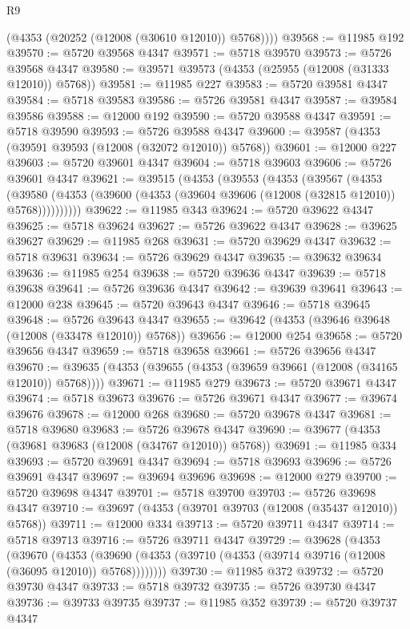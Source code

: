 \begin{lexlean}{R9}
\begin{coremodule}
        (@4353 (@20252 (@12008 (@30610 @12010)) @5768))))
@39568 := @11985 @192
@39570 := @5720 @39568 @4347
@39571 := @5718 @39570
@39573 := @5726 @39568 @4347
@39580 := @39571 @39573 (@4353 (@25955 (@12008 (@31333 @12010)) @5768))
@39581 := @11985 @227
@39583 := @5720 @39581 @4347
@39584 := @5718 @39583
@39586 := @5726 @39581 @4347
@39587 := @39584 @39586
@39588 := @12000 @192
@39590 := @5720 @39588 @4347
@39591 := @5718 @39590
@39593 := @5726 @39588 @4347
@39600 := @39587 (@4353 (@39591 @39593 (@12008 (@32072 @12010)) @5768))
@39601 := @12000 @227
@39603 := @5720 @39601 @4347
@39604 := @5718 @39603
@39606 := @5726 @39601 @4347
@39621 := @39515
    (@4353
      (@39553
        (@4353
          (@39567
            (@4353
              (@39580 (@4353 (@39600 (@4353 (@39604 @39606 (@12008 (@32815 @12010)) @5768))))))))))
@39622 := @11985 @343
@39624 := @5720 @39622 @4347
@39625 := @5718 @39624
@39627 := @5726 @39622 @4347
@39628 := @39625 @39627
@39629 := @11985 @268
@39631 := @5720 @39629 @4347
@39632 := @5718 @39631
@39634 := @5726 @39629 @4347
@39635 := @39632 @39634
@39636 := @11985 @254
@39638 := @5720 @39636 @4347
@39639 := @5718 @39638
@39641 := @5726 @39636 @4347
@39642 := @39639 @39641
@39643 := @12000 @238
@39645 := @5720 @39643 @4347
@39646 := @5718 @39645
@39648 := @5726 @39643 @4347
@39655 := @39642 (@4353 (@39646 @39648 (@12008 (@33478 @12010)) @5768))
@39656 := @12000 @254
@39658 := @5720 @39656 @4347
@39659 := @5718 @39658
@39661 := @5726 @39656 @4347
@39670 := @39635 (@4353 (@39655 (@4353 (@39659 @39661 (@12008 (@34165 @12010)) @5768))))
@39671 := @11985 @279
@39673 := @5720 @39671 @4347
@39674 := @5718 @39673
@39676 := @5726 @39671 @4347
@39677 := @39674 @39676
@39678 := @12000 @268
@39680 := @5720 @39678 @4347
@39681 := @5718 @39680
@39683 := @5726 @39678 @4347
@39690 := @39677 (@4353 (@39681 @39683 (@12008 (@34767 @12010)) @5768))
@39691 := @11985 @334
@39693 := @5720 @39691 @4347
@39694 := @5718 @39693
@39696 := @5726 @39691 @4347
@39697 := @39694 @39696
@39698 := @12000 @279
@39700 := @5720 @39698 @4347
@39701 := @5718 @39700
@39703 := @5726 @39698 @4347
@39710 := @39697 (@4353 (@39701 @39703 (@12008 (@35437 @12010)) @5768))
@39711 := @12000 @334
@39713 := @5720 @39711 @4347
@39714 := @5718 @39713
@39716 := @5726 @39711 @4347
@39729 := @39628
    (@4353
      (@39670
        (@4353 (@39690 (@4353 (@39710 (@4353 (@39714 @39716 (@12008 (@36095 @12010)) @5768))))))))
@39730 := @11985 @372
@39732 := @5720 @39730 @4347
@39733 := @5718 @39732
@39735 := @5726 @39730 @4347
@39736 := @39733 @39735
@39737 := @11985 @352
@39739 := @5720 @39737 @4347

\end{coremodule}
\end{lexlean}

